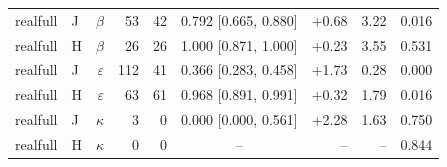 \begin{longtable}{llrrrcrrr}
realfull & J & $\beta$ & 53 & 42 & 0.792 [0.665, 0.880] & +0.68 & 3.22 & 0.016 \\
realfull & H & $\beta$ & 26 & 26 & 1.000 [0.871, 1.000] & +0.23 & 3.55 & 0.531 \\
realfull & J & $\varepsilon$ & 112 & 41 & 0.366 [0.283, 0.458] & +1.73 & 0.28 & 0.000 \\
realfull & H & $\varepsilon$ & 63 & 61 & 0.968 [0.891, 0.991] & +0.32 & 1.79 & 0.016 \\
realfull & J & $\kappa$ & 3 & 0 & 0.000 [0.000, 0.561] & +2.28 & 1.63 & 0.750 \\
realfull & H & $\kappa$ & 0 & 0 & -- & -- & -- & 0.844 \\
\end{longtable}
